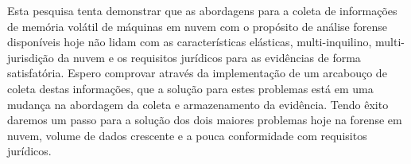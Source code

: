 \documentclass[12pt,				%
	openright,			%
	oneside,			%
	a4paper,			%
	english,			%
	brazil				%
	]{abntex2}
\begin{document}
\pagebreak

%
%

%


\setlength{\absparsep}{18pt} %
\begin{resumo}
Esta pesquisa tenta demonstrar que as abordagens para a coleta de informações de memória volátil de máquinas em nuvem com o propósito de análise forense disponíveis hoje não 
lidam com as características elásticas, multi-inquilino, multi-jurisdição da nuvem e os requisitos jurídicos para as evidências de forma satisfatória. Espero comprovar através
da implementação de um arcabouço de coleta destas informações, que a solução para estes problemas está em uma mudança na abordagem da coleta e armazenamento 
da evidência. Tendo êxito daremos um passo para a solução dos dois maiores problemas hoje na forense em nuvem, volume de dados crescente e a pouca conformidade com requisitos jurídicos.

 

\end{resumo}

%
%  


\end{document}
